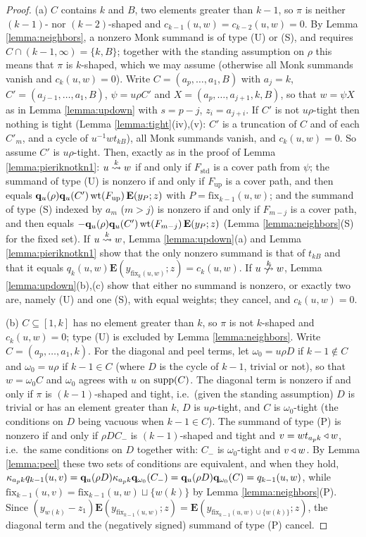 \documentclass{amsart}
\theoremstyle{definition}
\theoremstyle{remark}
\numberwithin{equation}{section}
\newcommand{\xrightsquigarrow}[2][]{%
	\mathrel{\mathop{\rightsquigarrow}\limits^{\scriptstyle #2}%
	\ifx\hfuzz#1\hfuzz\else_{\scriptstyle #1}\fi}%
}
\newcommand{\tom}[1]{\ensuremath{\xrightsquigarrow{#1}}}
\newcommand{\fx}{\mathrm{fix}}
\newcommand{\wte}{\mathbf{E}}
\begin{document}
\begin{proof}
(a) $C$ contains $k$ and $B$, two elements greater than $k-1$, so $\pi$ is neither $(k-1)$- nor $(k-2)$-shaped and $c_{k-1}(u,w)=c_{k-2}(u,w)=0$. By Lemma \ref{lemma:neighbors}, a nonzero Monk summand is of type (U) or (S), and requires $C\cap(k-1,\infty)=\{k,B\}$; together with the standing assumption on $\rho$ this means that $\pi$ is $k$-shaped, which we may assume (otherwise all Monk summands vanish and $c_k(u,w)=0$). Write $C=(a_p,\ldots,a_1,B)$ with $a_j=k$, $C'=(a_{j-1},\ldots,a_1,B)$, $\psi=u\rho C'$ and $X=(a_p,\ldots,a_{j+1},k,B)$, so that $w=\psi X$ as in Lemma \ref{lemma:updown} with $s=p-j$, $z_i=a_{j+i}$. If $C'$ is not $u\rho$-tight then nothing is tight (Lemma \ref{lemma:tight}(iv),(v): $C'$ is a truncation of $C$ and of each $C'_m$, and a cycle of $u^{-1}wt_{kB}$), all Monk summands vanish, and $c_k(u,w)=0$. So assume $C'$ is $u\rho$-tight. Then, exactly as in the proof of Lemma \ref{lemma:pieriknotkn1}: $u\tom{k}w$ if and only if $F_{\mathrm{std}}$ is a cover path from $\psi$; the summand of type (U) is nonzero if and only if $F_{\mathrm{up}}$ is a cover path, and then equals $\qw_u(\rho)\qw_u(C')\,\mathrm{wt}(F_{\mathrm{up}})\,\wte(y_P;z)$ with $P=\fx_{k-1}(u,w)$; and the summand of type (S) indexed by $a_m$ ($m>j$) is nonzero if and only if $F_{m-j}$ is a cover path, and then equals $-\qw_u(\rho)\qw_u(C')\,\mathrm{wt}(F_{m-j})\,\wte(y_P;z)$ (Lemma \ref{lemma:neighbors}(S) for the fixed set). If $u\tom{k}w$, Lemma \ref{lemma:updown}(a) and Lemma \ref{lemma:pieriknotkn1} show that the only nonzero summand is that of $t_{kB}$ and that it equals $q_k(u,w)\wte(y_{\fx_k(u,w)};z)=c_k(u,w)$. If $u\ntom{k}w$, Lemma \ref{lemma:updown}(b),(c) show that either no summand is nonzero, or exactly two are, namely (U) and one (S), with equal weights; they cancel, and $c_k(u,w)=0$.

(b) $C\subseteq[1,k]$ has no element greater than $k$, so $\pi$ is not $k$-shaped and $c_k(u,w)=0$; type (U) is excluded by Lemma \ref{lemma:neighbors}. Write $C=(a_p,\ldots,a_1,k)$. For the diagonal and peel terms, let $\omega_0=u\rho D$ if $k-1\notin C$ and $\omega_0=u\rho$ if $k-1\in C$ (where $D$ is the cycle of $k-1$, trivial or not), so that $w=\omega_0C$ and $\omega_0$ agrees with $u$ on $\mathrm{supp}(C)$. The diagonal term is nonzero if and only if $\pi$ is $(k-1)$-shaped and tight, i.e.\ (given the standing assumption) $D$ is trivial or has an element greater than $k$, $D$ is $u\rho$-tight, and $C$ is $\omega_0$-tight (the conditions on $D$ being vacuous when $k-1\in C$). The summand of type (P) is nonzero if and only if $\rho D C_-$ is $(k-1)$-shaped and tight and $v=wt_{a_pk}\triangleleft w$, i.e.\ the same conditions on $D$ together with: $C_-$ is $\omega_0$-tight and $v\triangleleft w$. By Lemma \ref{lemma:peel} these two sets of conditions are equivalent, and when they hold, $\kappa_{a_pk}q_{k-1}(u,v)=\mathbf{q}_u(\rho D)\kappa_{a_pk}\mathbf{q}_{\omega_0}(C_-)=\mathbf{q}_u(\rho D)\mathbf{q}_{\omega_0}(C)=q_{k-1}(u,w)$, while $\fx_{k-1}(u,v)=\fx_{k-1}(u,w)\sqcup\{w(k)\}$ by Lemma \ref{lemma:neighbors}(P). Since $(y_{w(k)}-z_1)\wte(y_{\fx_{k-1}(u,w)};z)=\wte(y_{\fx_{k-1}(u,w)\cup\{w(k)\}};z)$, the diagonal term and the (negatively signed) summand of type (P) cancel.


\end{proof}
\end{document}
